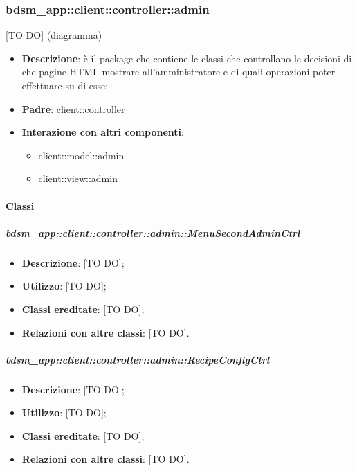 







\subsubsection{bdsm\_app::client::controller::admin} %
\label{ssub:bdsm_app_client_controller_admin}
[TO DO] (diagramma) \newline \newline

\begin{itemize}
	\item \textbf{Descrizione}: è il package che contiene le classi che controllano le decisioni di che pagine HTML mostrare all'amministratore e di quali operazioni poter effettuare su di esse;
	\item \textbf{Padre}: client::controller
	\item \textbf{Interazione con altri componenti}:
		\begin{itemize}
			\item client::model::admin
			\item client::view::admin
		\end{itemize}
\end{itemize}

	\paragraph{Classi} %
		\subparagraph{bdsm\_app::client::controller::admin::MenuSecondAdminCtrl} %
		\label{subp:bdsm_app_client_controller_admin_menusecondadminctrl}
			\begin{itemize}
				\item \textbf{Descrizione}: [TO DO];
				\item \textbf{Utilizzo}: [TO DO];
				\item \textbf{Classi ereditate}: [TO DO];
				\item \textbf{Relazioni con altre classi}: [TO DO].
			\end{itemize}

		\subparagraph{bdsm\_app::client::controller::admin::RecipeConfigCtrl} %
		\label{subp:bdsm_app_client_controller_admin_recipeconfigctrl}
			\begin{itemize}
				\item \textbf{Descrizione}: [TO DO];
				\item \textbf{Utilizzo}: [TO DO];
				\item \textbf{Classi ereditate}: [TO DO];
				\item \textbf{Relazioni con altre classi}: [TO DO].
			\end{itemize}

